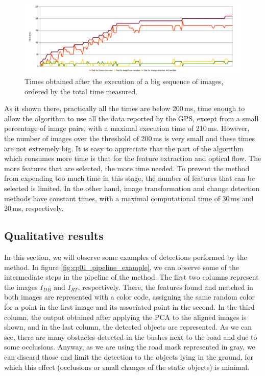 \begin{figure}[h!]
\centering
\includegraphics[width=\textwidth]{times}
\caption{Times obtained after the execution of a big sequence of images, ordered by the total time measured.}\label{fig:cp01_times}
\end{figure}

As it shown there, practically all the times are below 200\,ms, time enough to allow the algorithm to use all the data reported by the \ac{GPS}, except from a small percentage of image pairs, with a maximal execution time of 210\,ms. However, the number of images over the threshold of 200\,ms is very small and these times are not extremely big. It is easy to appreciate that the part of the algorithm which consumes more time is that for the feature extraction and optical flow. The more features that are selected, the more time needed. To prevent the method from expending too much time in this stage, the number of features that can be selected is limited. In the other hand, image transformation and change detection methods have constant times, with a maximal computational time of 30\,ms and 20\,ms, respectively.

\subsection{Qualitative results}\label{ch:chapter01_02_04}

In this section, we will observe some examples of detections performed by the method. In figure \ref{fig:cp01_pipeline_example}, we can observe some of the intermediate steps in the pipeline of the method. The first two columns represent the images $I_{DB}$ and $I_{RT}$, respectively. There, the features found and matched in both images are represented with a color code, assigning the same random color for a point in the first image and its associated point in the second. In the third column, the output obtained after applying the \ac{PCA} to the aligned images is shown, and in the last column, the detected objects are represented. As we can see, there are many obstacles detected in the bushes next to the road and due to some occlusions. Anyway, as we are using the road mask represented in gray, we can discard those and limit the detection to the objects lying in the ground, for which this effect (occlusions or small changes of the static objects) is minimal.

